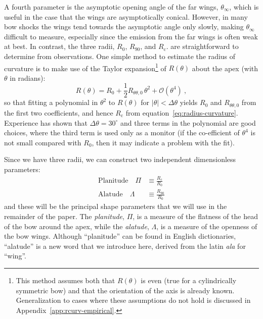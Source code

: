 \documentclass[useAMS, usenatbib, a4paper]{mnras}
\newcommand\C{\ensuremath{\mathrm{c}}}
\begin{document}
A fourth parameter is the asymptotic opening angle of the far wings,
\(\theta_\infty\), which is useful in the case that the wings are asymptotically
conical.  However, in many bow shocks the wings tend towards the
asymptotic angle only slowly, making \(\theta_\infty\) difficult to measure,
especially since the emission from the far wings is often weak at
best.  In contrast, the three radii, \(R_0\), \(R_{90}\), and
\(R_{\C}\). are straightforward to determine from observations.  One
simple method to estimate the radius of curvature is to make use of
the Taylor expansion\footnote{%
  This method assumes both that \(R(\theta)\) is even (true for a
  cylindrically symmetric bow) and that the orientation of the axis is
  already known.  Generalization to cases where these assumptions do
  not hold is discussed in Appendix~\ref{app:rcurv-empirical}.} %
of \(R(\theta)\) about the apex (with \(\theta\) in radians):
\begin{equation}
  \label{eq:taylor-R-theta}
  R(\theta) = R_0 + \frac12 R_{\theta\theta,0} \,\theta^2 + \mathcal{O}(\theta^4) \ ,
\end{equation}
so that fitting a polynomial in \(\theta^2\) to \(R(\theta)\) for
\(|\theta| < \Delta\theta \) yields \(R_0\) and \(R_{\theta\theta,0}\) from the first two
coefficients, and hence \(R_{\C}\) from
equation~\eqref{eq:radius-curvature}.  Experience has shown that
\(\Delta\theta = 30^\circ\) and three terms in the polynomial are good choices,
where the third term is used only as a monitor (if the co-efficient of
\(\theta^4\) is not small compared with \(R_0\), then it may indicate a
problem with the fit).

Since we have three radii, we can construct two independent
dimensionless parameters:
\begin{align}
  \label{eq:planitude}
  \text{Planitude} \quad \Pi & \equiv  \frac{R_{\C}} {R_0} \\
  \label{eq:alatude}
  \text{Alatude} \quad \Lambda & \equiv  \frac{R_{90}} {R_0}
\end{align}
and these will be the principal shape parameters that we will use in
the remainder of the paper.  The \textit{planitude}, \(\Pi\), is a
measure of the flatness of the head of the bow around the apex, while
the \textit{alatude}, \(\Lambda\), is a measure of the openness of the bow
wings.  Although ``planitude'' can be found in English dictionaries,
``alatude'' is a new word that we introduce here, derived from the
latin \textit{ala} for ``wing''.
\end{document}

